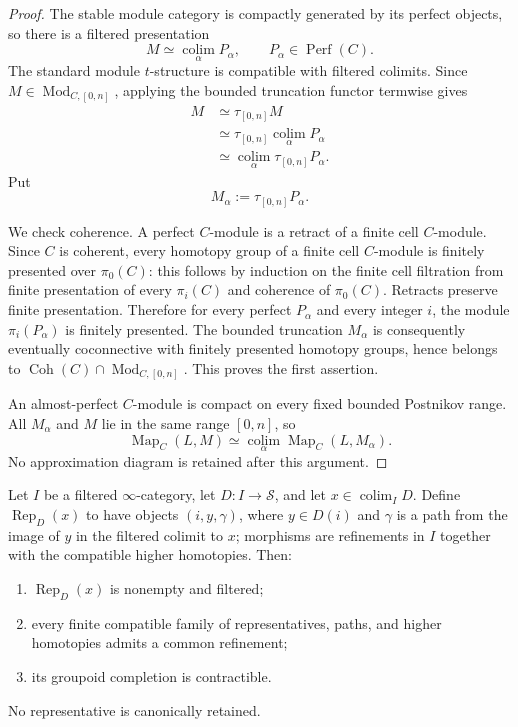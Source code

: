 \begin{proof}
The stable module category is compactly generated by its perfect objects, so
there is a filtered presentation
\[
    M\simeq\operatorname*{colim}_{\alpha}P_\alpha,
    \qquad
    P_\alpha\in\operatorname{Perf}(C).
\]
The standard module $t$-structure is compatible with filtered colimits.  Since
$M\in\operatorname{Mod}_{C,[0,n]}$, applying the bounded truncation functor
termwise gives
\[
\begin{aligned}
    M
    &\simeq \tau_{[0,n]}M\\
    &\simeq
    \tau_{[0,n]}
    \operatorname*{colim}_{\alpha}P_\alpha\\
    &\simeq
    \operatorname*{colim}_{\alpha}\tau_{[0,n]}P_\alpha.
\end{aligned}
\]
Put
\[
    M_\alpha:=\tau_{[0,n]}P_\alpha.
\]

We check coherence.  A perfect $C$-module is a retract of a finite cell
$C$-module.  Since $C$ is coherent, every homotopy group of a finite cell
$C$-module is finitely presented over $\pi_0(C)$: this follows by induction on
the finite cell filtration from finite presentation of every $\pi_i(C)$ and
coherence of $\pi_0(C)$.  Retracts preserve finite presentation.  Therefore
for every perfect $P_\alpha$ and every integer $i$, the module
$\pi_i(P_\alpha)$ is finitely presented.  The bounded truncation
$M_\alpha$ is consequently eventually coconnective with finitely presented
homotopy groups, hence belongs to
$\operatorname{Coh}(C)\cap\operatorname{Mod}_{C,[0,n]}$.
This proves the first assertion.

An almost-perfect $C$-module is compact on every fixed bounded Postnikov range.
All $M_\alpha$ and $M$ lie in the same range $[0,n]$, so
\[
    \operatorname{Map}_C(L,M)
    \simeq
    \operatorname*{colim}_{\alpha}
    \operatorname{Map}_C(L,M_\alpha).
\]
No approximation diagram is retained after this argument.
\end{proof}

\begin{lemma}
\label{lem:bnli-filtered-representatives}
Let $I$ be a filtered $\infty$-category, let $D:I\to\mathcal S$, and let
$x\in\operatorname*{colim}_I D$.  Define $\operatorname{Rep}_D(x)$ to have
objects $(i,y,\gamma)$, where $y\in D(i)$ and $\gamma$ is a path from the
image of $y$ in the filtered colimit to $x$; morphisms are refinements in $I$
together with the compatible higher homotopies.  Then:
\begin{enumerate}
    \item $\operatorname{Rep}_D(x)$ is nonempty and filtered;
    \item every finite compatible family of representatives, paths, and higher
    homotopies admits a common refinement;
    \item its groupoid completion is contractible.
\end{enumerate}
No representative is canonically retained.
\end{lemma}

